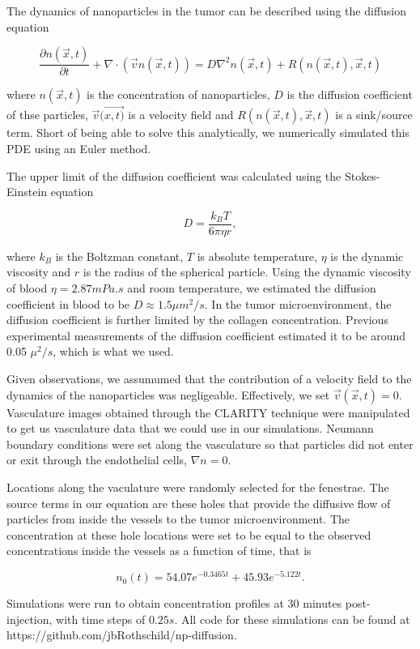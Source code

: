 The dynamics of nanoparticles in the tumor can be described using the diffusion equation

\begin{equation}\label{diffusion}
		\frac{\partial n(\vec{x},t)}{\partial t} + {\nabla \cdot (\vec{v}n(\vec{x},t)) }= D \nabla^2n(\vec{x},t) + R(n(\vec{x},t),\vec{x},t)
\end{equation}

where $n(\vec{x},t)$ is the concentration of nanoparticles, $D$ is the diffusion coefficient of thse particles, $\vec{v}(\vec{x,t)}$ is a velocity field and $R(n(\vec{x},t),\vec{x},t)$ is a sink/source term.
Short of being able to solve this analytically, we numerically simulated this PDE using an Euler method.

The upper limit of the diffusion coefficient was calculated using the Stokes-Einstein equation

\begin{equation}\label{conc_time}
		D = \frac{ k_B T }{ 6 \pi \eta r},
\end{equation}

where $k_B$ is the Boltzman constant, $T$ is absolute temperature, $\eta$ is the dynamic viscosity and $r$ is the radius of the spherical particle. Using the dynamic viscosity of blood $\eta = 2.87 mPa.s$ and room temperature, we estimated the diffusion coefficient in blood to be $D \approx 1.5 \mu m^2/s$. In the tumor microenvironment, the diffusion coefficient is further limited by the collagen concentration. Previous experimental measurements of the diffusion coefficient estimated it to be around 0.05 $\mu^2/s$, which is what we used.

Given observations, we assumumed that the contribution of a velocity field to the dynamics of the nanoparticles was negligeable.
Effectively, we set $\vec{v}(\vec{x},t)=0$.
Vasculature images obtained through the CLARITY technique were manipulated to get us vasculature data that we could use in our simulations.
Neumann boundary conditions were set along the vasculature so that particles did not enter or exit through the endothelial cells, $\nabla n = 0$.

Locations along the vaculature were randomly selected for the fenestrae.
The source terms in our equation are these holes that provide the diffusive flow of particles from inside the vessels to the tumor microenvironment.
The concentration at these hole locations were set to be equal to the observed concentrations inside the vessels as a function of time, that is

\begin{equation}\label{conc_time}
		n_0(t) = 54.07 e^{-0.3465 t} + 45.93e^{-5.122 t}.
\end{equation}

Simulations were run to obtain concentration profiles at 30 minutes post-injection, with time steps of $0.25s$.
All code for these simulations can be found at https://github.com/jbRothschild/np-diffusion.
